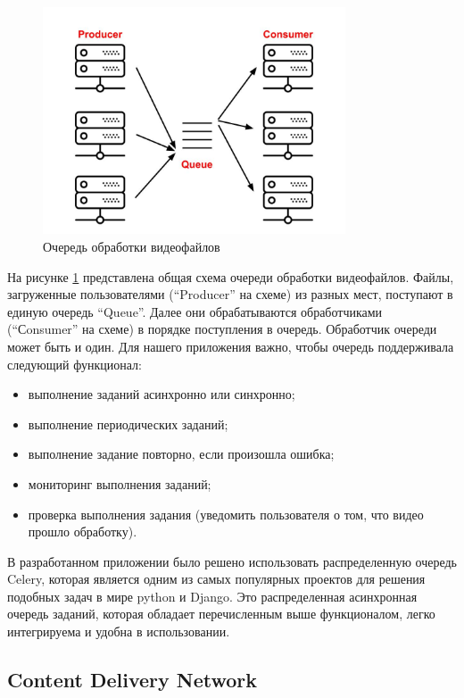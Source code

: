 \begin{figure}
  \centering
  \includegraphics[width=0.8\textwidth]{images/producer-consumer.jpg}
  \caption{Очередь обработки видеофайлов\label{producer-consumer}}
\end{figure}

На рисунке \ref{producer-consumer} представлена общая схема очереди обработки видеофайлов.
Файлы, загруженные пользователями (“Producer” на схеме) из разных мест,
поступают в единую очередь “Queue”. Далее они обрабатываются обработчиками (“Сonsumer” на схеме)
в порядке поступления в очередь. Обработчик очереди может быть и один.
Для нашего приложения важно, чтобы очередь поддерживала следующий функционал:
\begin{itemize}
  \item выполнение заданий асинхронно или синхронно;
  \item выполнение периодических заданий;
  \item выполнение задание повторно, если произошла ошибка;
  \item мониторинг выполнения заданий;
  \item проверка выполнения задания (уведомить пользователя о том, что видео прошло обработку).
\end{itemize}

В разработанном приложении было решено использовать распределенную очередь Celery,
которая является одним из самых популярных проектов для решения подобных задач в мире
python и Django. Это распределенная асинхронная очередь заданий, которая обладает
перечисленным выше функционалом, легко интегрируема и удобна в использовании.

\subsection{Content Delivery Network}

